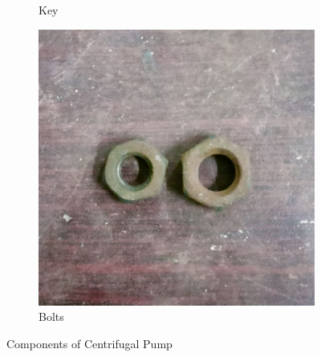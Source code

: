\documentclass[12pt]{article}
\begin{document}
\begin{figure}
\begin{subfigure}{0.3\textwidth}
      \caption{Key}
  \end{subfigure}
  \hfill
  \begin{subfigure}{0.3\textwidth}
      \includegraphics[width=\linewidth]{img/p_09.jpg}
      \caption{Bolts}
  \end{subfigure}

  \caption{Components of Centrifugal Pump}
\end{figure}

 
\end{document}
